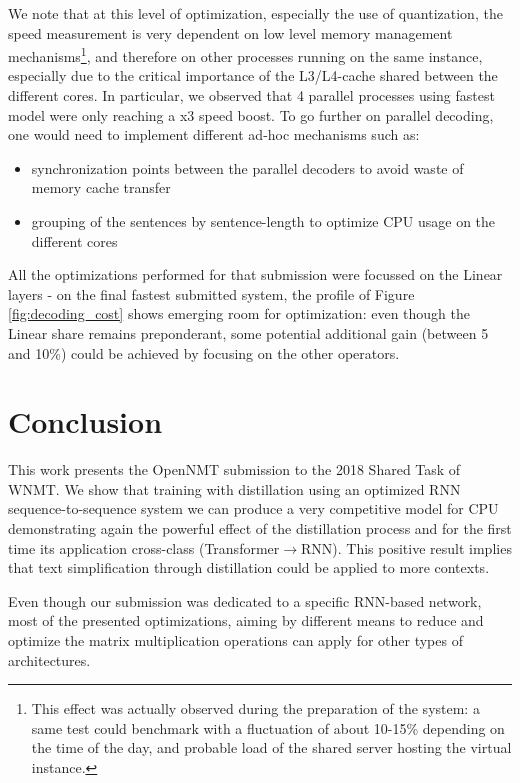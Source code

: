 \documentclass[11pt,a4paper]{article}
\begin{document}
We  note that at this level of optimization, especially the use
of quantization, the speed measurement is very dependent on low level
memory management mechanisms\footnote{This effect was actually observed
during the preparation of the system: a same test could benchmark with a fluctuation
of about 10-15\% depending on the time of the day, and probable load of the
shared server hosting the virtual instance.}, and therefore on other
processes running on the same instance, especially due to the critical
importance of the L3/L4-cache shared between the different cores. In
particular, we observed that 4 parallel processes using fastest model
were only reaching a x3 speed boost. To go further on parallel
decoding, one would need to implement different ad-hoc mechanisms such as:
\begin{itemize}
\item synchronization points between
the parallel decoders to avoid waste of memory cache transfer
\item grouping of the sentences by sentence-length to optimize CPU
usage on the different cores
\end{itemize}

All the optimizations performed for that submission were focussed on the Linear layers - on the final fastest submitted system, the profile of Figure \ref{fig:decoding_cost} shows emerging room for optimization: even though the Linear share remains preponderant, some potential additional gain (between 5 and 10\%) could be achieved by focusing on the other operators.

\section{Conclusion}

This work presents the OpenNMT submission to the 2018 Shared Task of
WNMT. We show that training with distillation using an optimized RNN
sequence-to-sequence system we can produce a very competitive
model for CPU demonstrating again the powerful effect of the distillation process and for the first time its application cross-class (Transformer$\rightarrow$RNN). This positive result implies that text simplification through distillation could be applied to more contexts.

Even though our submission was dedicated to a specific RNN-based network, most of the presented optimizations, aiming by different means to reduce and optimize the matrix multiplication operations can apply for other types of architectures.
\end{document}
